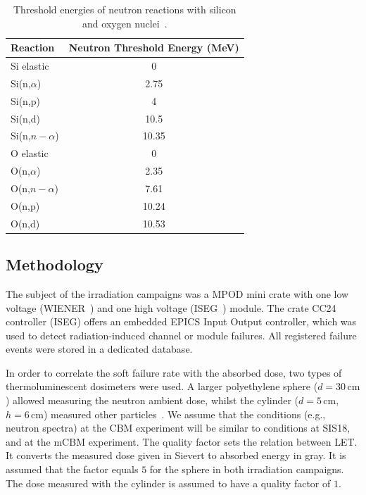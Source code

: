\begin{table}[!h]
\centering
\caption{Threshold energies of neutron reactions with silicon and oxygen nuclei~\cite{ENDF}.}
\begin{tabular}{lc}
\hline
Reaction         & Neutron Threshold Energy (MeV) \\ \hline
Si elastic       & 0                              \\
Si(n,$\alpha$)   & 2.75                           \\
Si(n,p)          & 4                              \\
Si(n,d)          & 10.5                           \\
Si(n,$n-\alpha$) & 10.35                          \\ \hline
O elastic        & 0                              \\
O(n,$\alpha$)    & 2.35                           \\
O(n,$n-\alpha$)  & 7.61                           \\
O(n,p)           & 10.24                          \\
O(n,d)           & 10.53                         
\end{tabular}

\label{cross-seciton}
\end{table}


\subsection{Methodology}

The subject of the irradiation campaigns was a MPOD mini crate with one low voltage (WIENER~\cite{wiener}) and one high voltage (ISEG~\cite{iseg}) module. The crate CC24 controller (ISEG) offers an embedded \gls{EPICS} Input Output controller, which was used to detect radiation-induced channel or module failures. All registered  failure events were stored in a dedicated database.  

In order to correlate the soft failure rate with the absorbed dose, two types of thermoluminescent dosimeters were used. A larger polyethylene sphere ($d = 30\,\mathrm{cm}$) allowed measuring the neutron ambient dose, whilst the cylinder ($d = 5\,\mathrm{cm}$, $h = 6\,\mathrm{cm}$) measured other particles~\cite{bonner}. We assume that the conditions (e.g., neutron spectra) at the \gls{CBM} experiment will be similar to conditions at SIS18, and at the \gls{mCBM} experiment. The quality factor sets the relation between \gls{LET}. It converts the measured dose given in Sievert to absorbed energy in gray. It is assumed that the factor equals $5$ for the sphere in both irradiation campaigns. The dose measured with the cylinder is assumed to have a quality factor of $1$.

